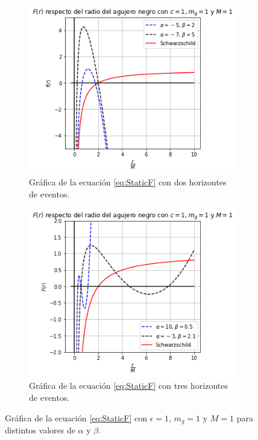\begin{figure}[H]
\ContinuedFloat
      \hfill
      \begin{subfigure}[b]{0.4\textwidth}
          \includegraphics[scale=0.45]{SoluciónEstática/Horizonte de Eventos/F(r) Estática2.png}
          \caption{Gráfica de la ecuación \eqref{eq:StaticF} con dos horizontes de eventos.}
          \label{fig:F(R)sols2}
      \end{subfigure}
    \hspace{1cm}
    \begin{subfigure}[b]{0.4\textwidth}
    \centering
        \includegraphics[scale=0.45]{SoluciónEstática/Horizonte de Eventos/F(r) Estática3.png}
        \caption{Gráfica de la ecuación \eqref{eq:StaticF} con tres horizontes de eventos.}
        \label{fig:F(R)sols3}
    \end{subfigure}
     
     \caption{Gráfica de la ecuación \eqref{eq:StaticF} con $\epsilon=1$, $m_g=1$ y $M=1$ para distintos valores de $\alpha$ y $\beta$.}
     \label{fig:F(r)sols}
 \end{figure}
  
